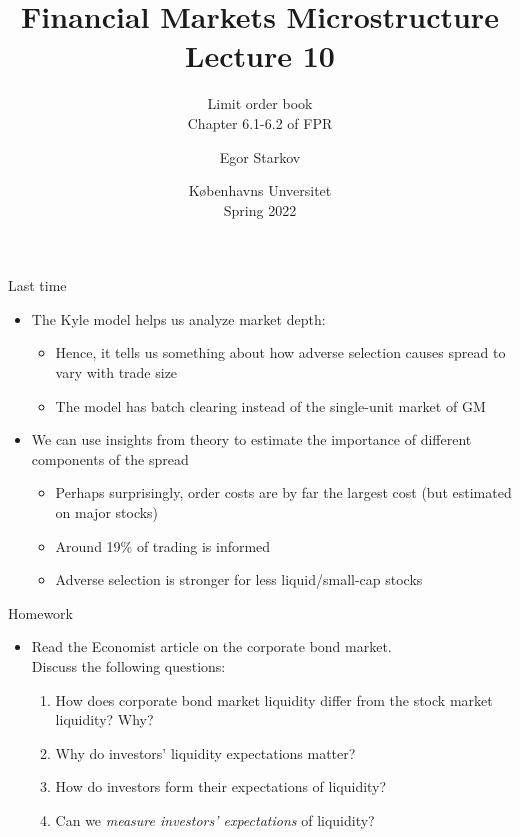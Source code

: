 \documentclass[english,10pt
,aspectratio=169
]{beamer}
\title{Financial Markets Microstructure \\ Lecture 10}
\subtitle{Limit order book\\
	Chapter 6.1-6.2 of FPR}
\author{Egor Starkov}
\date{K{\o}benhavns Unversitet \\
	Spring 2022}
\begin{document}
\frame[plain]{\titlepage}


\begin{frame}{Last time}
	\begin{itemize}
		\item The Kyle model helps us analyze market depth:
		\begin{itemize}
			\item Hence, it tells us something about how adverse selection causes spread to vary with trade size
			\item The model has batch clearing instead of the single-unit market of GM
		\end{itemize}
		\item We can use insights from theory to estimate the importance of different components of the spread
		\begin{itemize}
			\item Perhaps surprisingly, order costs are by far the largest cost (but estimated on major stocks)
			\item Around 19\% of trading is informed
			\item Adverse selection is stronger for less liquid/small-cap stocks
		\end{itemize}
	\end{itemize}
\end{frame}


\begin{frame}{Homework}
	\begin{itemize}
		\item Read the Economist article on the corporate bond market. 
		\\
		Discuss the following questions:
		\begin{enumerate}
			\item How does corporate bond market liquidity differ from the stock market liquidity? Why?
			\item Why do investors' liquidity expectations matter?
			\item How do investors form their expectations of liquidity?
			\item Can we \emph{measure investors' expectations} of liquidity?
		\end{enumerate}
	\end{itemize}
\end{frame}
\end{document}
